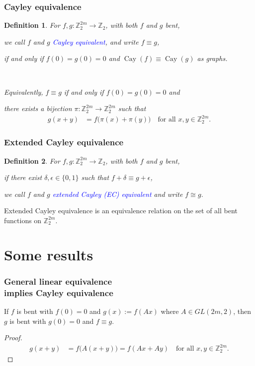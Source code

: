 \documentclass[pdf,sprung,slideColor,nocolorBG]{beamer}
\newenvironment{colortheme}[1]{
\def\ProvidesPackageRCS $##1${\relax}
\renewcommand{\ProcessOptions}{\relax}
\makeatletter

\makeatother
}{}
\newcommand{\mb}[1]{\mathbb{#1}}
\newcommand{\Emph}[1]{\emph{\textcolor{blue}{#1}}}
\newcommand{\To}{\rightarrow}
\newcommand{\Cay}[1]{\operatorname{Cay}\left(#1\right)}
\newcommand{\Z}{\mb{Z}}
\newtheorem{Def}{Definition}
\begin{document}
\begin{colortheme}{jubata}
\begin{frame}
\frametitle{Cayley equivalence}
\begin{Def}
%
For $f, g : \Z_2^{2m} \To \Z_2$, with both $f$ and $g$ bent,

we call $f$ and $g$ \Emph{Cayley equivalent},
and write $f \equiv g$,

if and only if $f(0)=g(0)=0$ and $\Cay{f} \equiv \Cay{g}$ as graphs.

~

Equivalently, $f \equiv g$ if and only if $f(0)=g(0)=0$ and

there exists a bijection $\pi : \Z_2^{2m} \To \Z_2^{2m}$ such that
\begin{align*}
g(x+y) &= f \big(\pi(x)+\pi(y)\big) \quad \text{for all~} x,y \in \Z_2^{2m}.
\end{align*}
\end{Def}
\end{frame}
\begin{frame}
\frametitle{Extended Cayley equivalence}
\begin{Def}
For $f, g : \Z_2^{2m} \To \Z_2$, with both $f$ and $g$ bent,

if there exist $\delta, \epsilon \in \{0,1\}$ such that $f + \delta \equiv g + \epsilon$,

we call $f$ and $g$ \Emph{extended Cayley (EC) equivalent} and write $f \cong g$.
\end{Def}
Extended Cayley equivalence is an equivalence relation on the set of all bent functions on $\Z_2^{2m}$.
\end{frame}
\section{Some results}

\begin{frame}
\frametitle{General linear equivalence \\ implies Cayley equivalence}

\begin{Theorem}
If $f$ is bent with $f(0)=0$ and $g(x) := f(A x)$ where $A \in GL(2m,2)$,
then $g$ is bent with $g(0)=0$ and $f \equiv g$.
\end{Theorem}
\begin{proof}
\begin{align*}
g(x+y) &= f\big(A(x+y)\big) = f(A x + A y)\quad \text{for all~} x,y \in \Z_2^{2m}.
\end{align*}
\end{proof}


\end{frame}
\end{colortheme}
\end{document}
